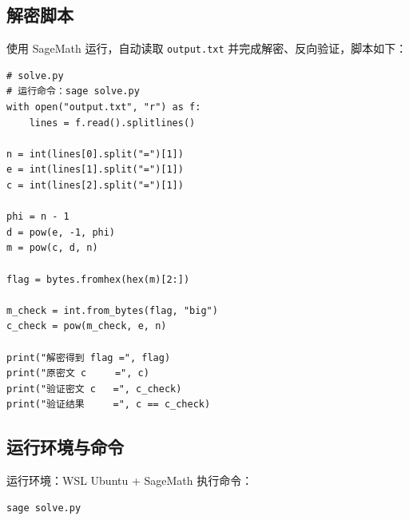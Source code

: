 \documentclass{article}
\begin{document}
\subsection{解密脚本}
使用 SageMath 运行，自动读取 \texttt{output.txt} 并完成解密、反向验证，脚本如下：
\begin{lstlisting}
# solve.py
# 运行命令：sage solve.py
with open("output.txt", "r") as f:
    lines = f.read().splitlines()

n = int(lines[0].split("=")[1])
e = int(lines[1].split("=")[1])
c = int(lines[2].split("=")[1])

phi = n - 1
d = pow(e, -1, phi)
m = pow(c, d, n)

flag = bytes.fromhex(hex(m)[2:])

m_check = int.from_bytes(flag, "big")
c_check = pow(m_check, e, n)

print("解密得到 flag =", flag)
print("原密文 c     =", c)
print("验证密文 c   =", c_check)
print("验证结果     =", c == c_check)
\end{lstlisting}

\subsection{运行环境与命令}
运行环境：WSL Ubuntu + SageMath
执行命令：
\begin{lstlisting}[language=bash]
sage solve.py
\end{lstlisting}
\end{document}
